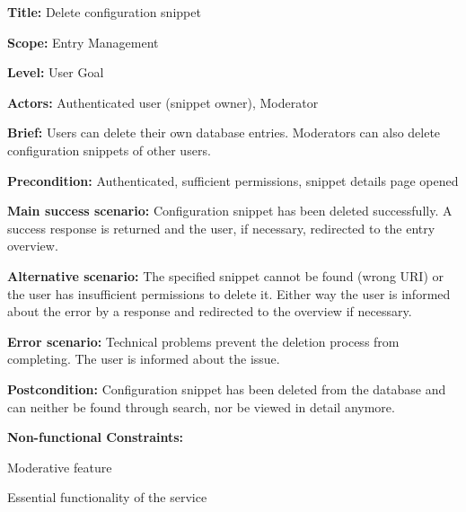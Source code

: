 
\begin{DoxyItemize}
\item {\bfseries{Title\+:}} Delete configuration snippet
\item {\bfseries{Scope\+:}} Entry Management
\item {\bfseries{Level\+:}} User Goal
\item {\bfseries{Actors\+:}} Authenticated user (snippet owner), Moderator
\item {\bfseries{Brief\+:}} Users can delete their own database entries. Moderators can also delete configuration snippets of other users.
\end{DoxyItemize}


\begin{DoxyItemize}
\item {\bfseries{Precondition\+:}} Authenticated, sufficient permissions, snippet details page opened
\item {\bfseries{Main success scenario\+:}} Configuration snippet has been deleted successfully. A success response is returned and the user, if necessary, redirected to the entry overview.
\item {\bfseries{Alternative scenario\+:}} The specified snippet cannot be found (wrong U\+RI) or the user has insufficient permissions to delete it. Either way the user is informed about the error by a response and redirected to the overview if necessary.
\item {\bfseries{Error scenario\+:}} Technical problems prevent the deletion process from completing. The user is informed about the issue.
\item {\bfseries{Postcondition\+:}} Configuration snippet has been deleted from the database and can neither be found through search, nor be viewed in detail anymore.
\item {\bfseries{Non-\/functional Constraints\+:}}
\begin{DoxyItemize}
\item Moderative feature
\item Essential functionality of the service 
\end{DoxyItemize}
\end{DoxyItemize}